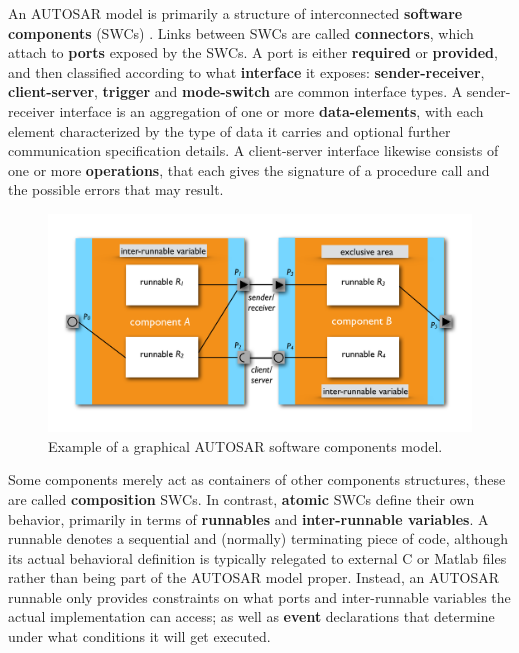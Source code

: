 \documentclass[10pt,conference]{IEEEtran}
\begin{document}
An AUTOSAR model is primarily a structure of interconnected \textbf{software components} (SWCs) \cite{AR:SWC}. Links between SWCs are called \textbf{connectors}, which attach to \textbf{ports} exposed by the SWCs. A port is either \textbf{required} or \textbf{provided}, and then classified according to what \textbf{interface} it exposes: \textbf{sender-receiver}, \textbf{client-server}, \textbf{trigger} and \textbf{mode-switch} are common interface types. A sender-receiver interface is an aggregation of one or more \textbf{data-elements}, with each element characterized by the type of data it carries and optional further communication specification details. A client-server interface likewise consists of one or more \textbf{operations}, that each gives the signature of a procedure call and the possible errors that may result.

\begin{figure}
\includegraphics[page=1,width=\textwidth]{Fig}
\caption{\label{fig:model}{Example of a graphical AUTOSAR software components model.}}
\end{figure}


Some components merely act as containers of other components structures, these are called \textbf{composition} SWCs. In contrast, \textbf{atomic} SWCs define their own behavior, primarily in terms of \textbf{runnables} and \textbf{inter-runnable variables}. A runnable denotes a sequential and (normally) terminating piece of code, although its actual behavioral definition is typically relegated to external C or Matlab files rather than being part of the AUTOSAR model proper. Instead, an AUTOSAR runnable only provides constraints on what ports and inter-runnable variables the actual implementation can access; as well as \textbf{event} declarations that determine under what conditions it will get executed.
\end{document}
